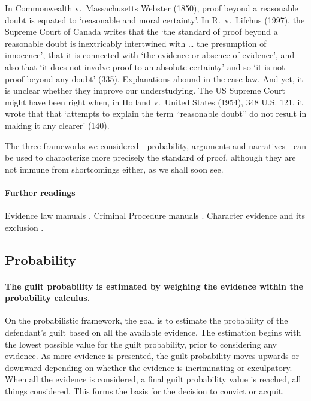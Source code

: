 \documentclass[10pt]{article}
\begin{document}
In Commonwealth v.\ Massachusetts Webster (1850), 
proof beyond a reasonable doubt is equated to 
`reasonable and moral certainty'. In R.\ v.\ Lifchus (1997),  the Supreme Court of Canada writes that 
the `the standard of proof beyond a reasonable 
doubt is inextricably intertwined with \dots 
the presumption of innocence', that it is connected with `the evidence or  
absence of evidence', and also that `it does not involve proof to an absolute certainty' and so 
`it is not proof beyond any doubt' (335). 
Explanations abound in the case law. And yet, it is unclear 
whether they improve our understudying. The US Supreme Court might have been right when, in Holland v.\ United States (1954), 348 U.S. 121, 
it wrote that that `attempts to explain the term ``reasonable doubt'' do not result in making it any clearer' (140).
 
 
The three frameworks we considered---probability, arguments and narratives---can be used to characterize 
more precisely the standard of proof, although they are not immune from shortcomings either, 
as we shall soon see.


\paragraph{Further readings}
Evidence law manuals  \citep{fisher2008,  mendez2008}. 
Criminal Procedure manuals \citep{allenEtAl2011}.
Character evidence and its exclusion \citep{redmayne2015}.
 

 
 




\subsection{Probability}


\paragraph{The guilt probability is estimated by weighing  the evidence within the probability calculus.}

 On the probabilistic framework, the goal is to estimate the probability of the defendant's guilt based 
 on all the available evidence. The estimation begins with the lowest possible value 
for the guilt probability, prior to considering any evidence. As more evidence is presented, the guilt probability 
moves upwards or downward depending on whether the evidence is incriminating or exculpatory. 
When all the evidence is considered, a final guilt probability value is 
reached, all things considered. This forms the basis for 
the decision to convict or acquit. 
\end{document}
